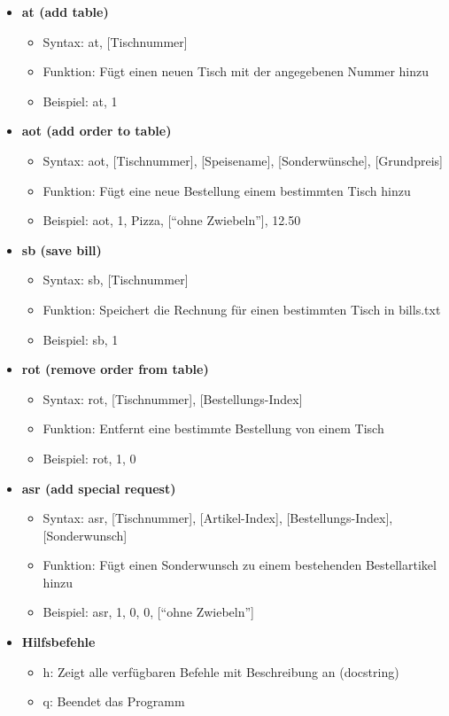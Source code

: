 \documentclass[a4paper,11pt]{article}
\begin{document}
\begin{itemize}
    \item \textbf{at (add table)}
    \begin{itemize}
        \item Syntax: at, [Tischnummer]
        \item Funktion: Fügt einen neuen Tisch mit der angegebenen Nummer hinzu
        \item Beispiel: at, 1
    \end{itemize}

    \item \textbf{aot (add order to table)}
    \begin{itemize}
        \item Syntax: aot, [Tischnummer], [Speisename], [Sonderwünsche], [Grundpreis]
        \item Funktion: Fügt eine neue Bestellung einem bestimmten Tisch hinzu
        \item Beispiel: aot, 1, Pizza, [``ohne Zwiebeln''], 12.50
    \end{itemize}

    \item \textbf{sb (save bill)}
    \begin{itemize}
        \item Syntax: sb, [Tischnummer]
        \item Funktion: Speichert die Rechnung für einen bestimmten Tisch in bills.txt
        \item Beispiel: sb, 1
    \end{itemize}

    \item \textbf{rot (remove order from table)}
    \begin{itemize}
        \item Syntax: rot, [Tischnummer], [Bestellungs-Index]
        \item Funktion: Entfernt eine bestimmte Bestellung von einem Tisch
        \item Beispiel: rot, 1, 0
    \end{itemize}

    \item \textbf{asr (add special request)}
    \begin{itemize}
        \item Syntax: asr, [Tischnummer], [Artikel-Index], [Bestellungs-Index], [Sonderwunsch]
        \item Funktion: Fügt einen Sonderwunsch zu einem bestehenden Bestellartikel hinzu
        \item Beispiel: asr, 1, 0, 0, [``ohne Zwiebeln'']
    \end{itemize}

    \item \textbf{Hilfsbefehle}
    \begin{itemize}
        \item h: Zeigt alle verfügbaren Befehle mit Beschreibung an (docstring)
        \item q: Beendet das Programm
    \end{itemize}
\end{itemize}
\end{document}
